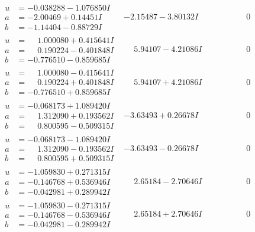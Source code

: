 \documentclass[1p]{elsarticle_modified}
\theoremstyle{definition}
\begin{document}
$$\begin{array}{c|c|c}
\begin{aligned}
u &= -0.038288 - 1.076850 I \\
a &= -2.00469 + 0.14451 I \\
b &= -1.14404 - 0.88729 I\end{aligned}
 & -2.15487 - 3.80132 I & \phantom{-0.000000 } 0 \\ \hline\begin{aligned}
u &= \phantom{-}1.000080 + 0.415641 I \\
a &= \phantom{-}0.190224 - 0.401848 I \\
b &= -0.776510 - 0.859685 I\end{aligned}
 & \phantom{-}5.94107 - 4.21086 I & \phantom{-0.000000 } 0 \\ \hline\begin{aligned}
u &= \phantom{-}1.000080 - 0.415641 I \\
a &= \phantom{-}0.190224 + 0.401848 I \\
b &= -0.776510 + 0.859685 I\end{aligned}
 & \phantom{-}5.94107 + 4.21086 I & \phantom{-0.000000 } 0 \\ \hline\begin{aligned}
u &= -0.068173 + 1.089420 I \\
a &= \phantom{-}1.312090 + 0.193562 I \\
b &= \phantom{-}0.800595 - 0.509315 I\end{aligned}
 & -3.63493 + 0.26678 I & \phantom{-0.000000 } 0 \\ \hline\begin{aligned}
u &= -0.068173 - 1.089420 I \\
a &= \phantom{-}1.312090 - 0.193562 I \\
b &= \phantom{-}0.800595 + 0.509315 I\end{aligned}
 & -3.63493 - 0.26678 I & \phantom{-0.000000 } 0 \\ \hline\begin{aligned}
u &= -1.059830 + 0.271315 I \\
a &= -0.146768 + 0.536946 I \\
b &= -0.042981 + 0.289942 I\end{aligned}
 & \phantom{-}2.65184 - 2.70646 I & \phantom{-0.000000 } 0 \\ \hline\begin{aligned}
u &= -1.059830 - 0.271315 I \\
a &= -0.146768 - 0.536946 I \\
b &= -0.042981 - 0.289942 I\end{aligned}
 & \phantom{-}2.65184 + 2.70646 I & \phantom{-0.000000 } 0 \\ \hline\begin{aligned}

\end{aligned}
\end{array}$$
\end{document}
